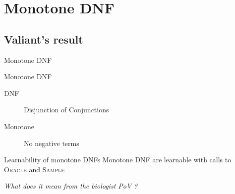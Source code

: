 \documentclass{beamer}
\newcommand{\transition}{\vspace{1em}\flushright \itshape}
\begin{document}
\section{Monotone DNF}
\subsection{Valiant's result}
\begin{frame}{Monotone DNF}
	\begin{block}{Monotone DNF}
		\begin{description}
			\item[DNF] Disjunction of Conjunctions
			\item[Monotone] No negative terms
		\end{description}
	\end{block}
\begin{block}{Learnability of monotone DNFs}
	Monotone DNF are learnable with calls to \textsc{Oracle} and \textsc{Sample}
\end{block}
\transition What does it mean from the biologist PoV ?
\end{frame}
\end{document}
